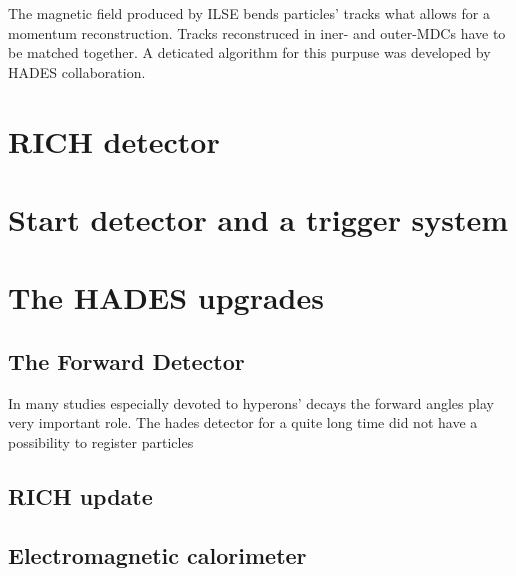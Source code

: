 The magnetic field produced by ILSE bends particles' tracks what allows for a momentum reconstruction. Tracks reconstruced in iner- and outer-MDCs have to be matched together. A deticated algorithm for this purpuse was developed by HADES collaboration. 


\section{RICH detector}

\section{Start detector and a trigger system}

\section{The HADES upgrades}

\subsection{The Forward Detector}
\label{subsec:FwDet}
In many studies especially devoted to hyperons' decays the forward angles play very important role. The hades detector for a quite long time did not have a possibility to register particles 
\subsection{RICH update}

\subsection{Electromagnetic calorimeter}

\label{chapter:HADES_upgrades}